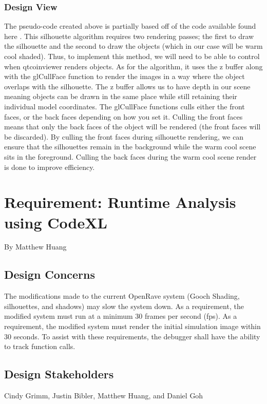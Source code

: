 \documentclass[10pt,journal,compsoc,draftclsnofoot]{IEEEtran}
\begin{document}
\begin{flushleft}
\subsubsection{Design View}
The pseudo-code created above is partially based off of the code available found here \cite{siledges}.
This silhouette algorithm requires two rendering passes; the first to draw the silhouette and the second to draw the objects (which in our case will be warm cool shaded).
Thus, to implement this method, we will need to be able to control when qtcoinviewer renders objects.
As for the algorithm, it uses the z buffer along with the glCullFace function to render the images in a way where the object overlaps with the silhouette.
The z buffer allows us to have depth in our scene meaning objects can be drawn in the same place while still retaining their individual model coordinates.
The glCullFace functions culls either the front faces, or the back faces depending on how you set it.
Culling the front faces means that only the back faces of the object will be rendered (the front faces will be discarded).
By culling the front faces during silhouette rendering, we can ensure that the silhouettes remain in the background while the warm cool scene sits in the foreground.
Culling the back faces during the warm cool scene render is done to improve efficiency. 
\newpage

\section{Requirement: Runtime Analysis using CodeXL}
\large{By Matthew Huang}

\normalsize
\subsection{Design Concerns}
The modifications made to the current OpenRave system (Gooch Shading, silhouettes, and shadows) may slow the system down.
As a requirement, the modified system must run at a minimum 30 frames per second (fps).
As a requirement, the modified system must render the initial simulation image within 30 seconds.
To assist with these requirements, the debugger shall have the ability to track function calls.

\subsection{Design Stakeholders}
Cindy Grimm, Justin Bibler, Matthew Huang, and Daniel Goh


\end{flushleft}
\end{document}
